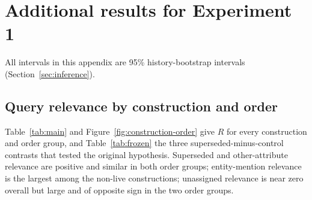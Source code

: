 \section{Additional results for Experiment 1}
\label{app:exp1}

All intervals in this appendix are 95\% history-bootstrap intervals (Section~\ref{sec:inference}).

\subsection{Query relevance by construction and order}

Table~\ref{tab:main} and Figure~\ref{fig:construction-order} give $R$ for every construction and order group, and Table~\ref{tab:frozen} the three superseded-minus-control contrasts that tested the original hypothesis. Superseded and other-attribute relevance are positive and similar in both order groups; entity-mention relevance is the largest among the non-live constructions; unassigned relevance is near zero overall but large and of opposite sign in the two order groups.

